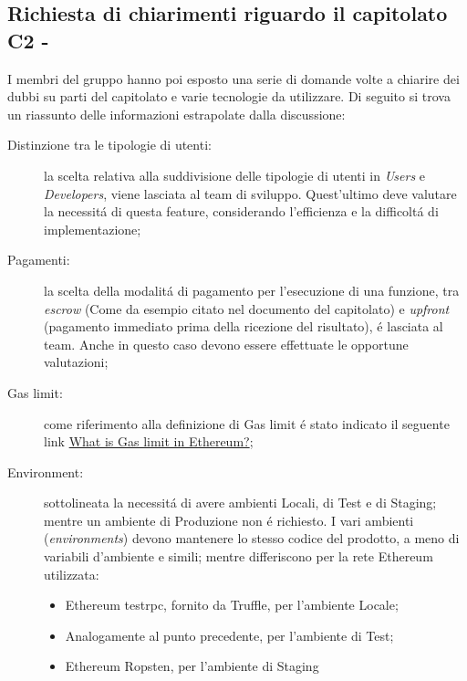 \subsection{Richiesta di chiarimenti riguardo il capitolato C2 - \NomeProgetto}
I membri del gruppo hanno poi esposto una serie di domande volte a chiarire dei dubbi su parti del capitolato e varie tecnologie da utilizzare.
Di seguito si trova un riassunto delle informazioni estrapolate dalla discussione:
\begin{description}
	\item[Distinzione tra le tipologie di utenti:] la scelta relativa alla suddivisione delle tipologie di utenti in \textit{Users} e \textit{Developers}, viene lasciata al team di sviluppo. Quest'ultimo deve valutare la necessitá di questa feature, considerando l'efficienza e la difficoltá di implementazione;
	\item[Pagamenti:] la scelta della modalitá di pagamento per l'esecuzione di una funzione, tra \textit{escrow} (Come da esempio citato nel documento del capitolato) e \textit{upfront} (pagamento immediato prima della ricezione del risultato), é lasciata al team. Anche in questo caso devono essere effettuate le opportune valutazioni;
	\item[Gas limit:] come riferimento alla definizione di Gas limit é stato indicato il seguente link \href{https://bitcoin.stackexchange.com/questions/39132/what-is-gas-limit-in-ethereum}{What is Gas limit in Ethereum?};
	\item[Environment:] sottolineata la necessitá di avere ambienti Locali, di Test e di Staging; mentre un ambiente di Produzione non é richiesto. I vari ambienti (\textit{environments}) devono mantenere lo stesso codice del prodotto, a meno di variabili d'ambiente e simili; mentre differiscono per la rete Ethereum utilizzata:
	\begin{itemize}
		\item Ethereum testrpc, fornito da Truffle, per l'ambiente Locale;
		\item Analogamente al punto precedente, per l'ambiente di Test;
		\item Ethereum Ropsten, per l'ambiente di Staging
	\end{itemize}
\end{description}

